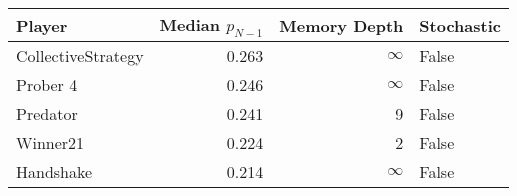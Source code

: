 \begin{tabular}{lrrl}
\toprule
             Player &  Median $p_{N-1}$ &  Memory Depth & Stochastic \\
\midrule
 CollectiveStrategy &             0.263 &            \(\infty\) &      False \\
           Prober 4 &             0.246 &            \(\infty\) &      False \\
           Predator &             0.241 &             9 &      False \\
           Winner21 &             0.224 &             2 &      False \\
          Handshake &             0.214 &            \(\infty\) &      False \\
\bottomrule
\end{tabular}
